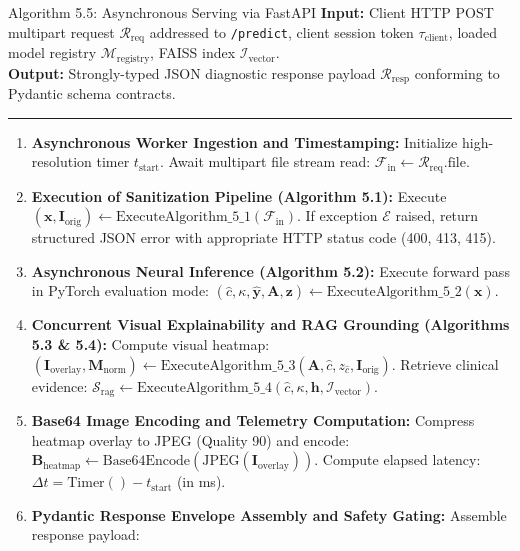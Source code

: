 \documentclass[12pt,a4paper]{report}
\begin{document}
\begin{algoBox}[top=5pt, bottom=5pt, before skip=4pt, after skip=6pt]{Algorithm 5.5: Asynchronous Serving via FastAPI}
\label{algo:fastapi_dispatch}
\textbf{Input:} Client HTTP POST multipart request $\mathcal{R}_{\text{req}}$ addressed to \texttt{/predict}, client session token $\tau_{\text{client}}$, loaded model registry $\mathcal{M}_{\text{registry}}$, FAISS index $\mathcal{I}_{\text{vector}}$.\\
\textbf{Output:} Strongly-typed JSON diagnostic response payload $\mathcal{R}_{\text{resp}}$ conforming to Pydantic schema contracts.\\[-6pt]
\noindent\rule{\linewidth}{0.4pt}
\begin{enumerate}[1:]
  \setlength{\itemsep}{2pt}
  \setlength{\parsep}{0pt}
  \item \textbf{Asynchronous Worker Ingestion and Timestamping:} Initialize high-resolution timer $t_{\text{start}}$. Await multipart file stream read: $\mathcal{F}_{\text{in}} \leftarrow \mathcal{R}_{\text{req}}.\mathrm{file}$.
  \item \textbf{Execution of Sanitization Pipeline (Algorithm 5.1):} Execute $(\mathbf{x}, \mathbf{I}_{\text{orig}}) \leftarrow \mathrm{ExecuteAlgorithm\_5\_1}(\mathcal{F}_{\text{in}})$. If exception $\mathcal{E}$ raised, return structured JSON error with appropriate HTTP status code (400, 413, 415).
  \item \textbf{Asynchronous Neural Inference (Algorithm 5.2):} Execute forward pass in PyTorch evaluation mode: $(\hat{c}, \kappa, \hat{\mathbf{y}}, \mathbf{A}, \mathbf{z}) \leftarrow \mathrm{ExecuteAlgorithm\_5\_2}(\mathbf{x})$.
  \item \textbf{Concurrent Visual Explainability and RAG Grounding (Algorithms 5.3 \& 5.4):} Compute visual heatmap: $(\mathbf{I}_{\text{overlay}}, \mathbf{M}_{\text{norm}}) \leftarrow \mathrm{ExecuteAlgorithm\_5\_3}(\mathbf{A}, \hat{c}, z_{\hat{c}}, \mathbf{I}_{\text{orig}})$. Retrieve clinical evidence: $\mathcal{S}_{\text{rag}} \leftarrow \mathrm{ExecuteAlgorithm\_5\_4}(\hat{c}, \kappa, \mathbf{h}, \mathcal{I}_{\text{vector}})$.
  \item \textbf{Base64 Image Encoding and Telemetry Computation:} Compress heatmap overlay to JPEG (Quality 90) and encode: $\mathbf{B}_{\text{heatmap}} \leftarrow \mathrm{Base64Encode}(\mathrm{JPEG}(\mathbf{I}_{\text{overlay}}))$. Compute elapsed latency: $\Delta t = \mathrm{Timer}() - t_{\text{start}}$ (in ms).
  \pagebreak
  \item \textbf{Pydantic Response Envelope Assembly and Safety Gating:} Assemble response payload:

\end{enumerate}
\end{algoBox}
\end{document}
